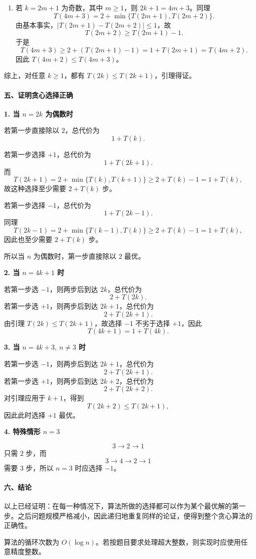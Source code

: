 \documentclass[12pt,a4paper]{article}
\begin{document}
\begin{answerbox}
\begin{enumerate}[leftmargin=2.5em]
    \item 若 $k=2m+1$ 为奇数，其中 $m\ge 1$，则 $2k+1=4m+3$。同理
    \[
    T(4m+3)=2+\min\{T(2m+1),T(2m+2)\}.
    \]
    由基本事实，$|T(2m+1)-T(2m+2)|\le 1$，故
    \[
    T(2m+2)\ge T(2m+1)-1.
    \]
    于是
    \[
    T(4m+3)\ge 2+(T(2m+1)-1)=1+T(2m+1)=T(4m+2).
    \]
    因此 $T(4m+2)\le T(4m+3)$。
\end{enumerate}

综上，对任意 $k\ge 1$，都有 $T(2k)\le T(2k+1)$，引理得证。

\paragraph{五、证明贪心选择正确}
\textbf{1. 当 $n=2k$ 为偶数时}

若第一步直接除以 $2$，总代价为
\[
1+T(k).
\]

若第一步选择 $+1$，总代价为
\[
1+T(2k+1).
\]
而
\[
T(2k+1)=2+\min\{T(k),T(k+1)\}\ge 2+T(k)-1=1+T(k),
\]
故这种选择至少需要 $2+T(k)$ 步。

若第一步选择 $-1$，总代价为
\[
1+T(2k-1).
\]
同理
\[
T(2k-1)=2+\min\{T(k-1),T(k)\}\ge 2+T(k)-1=1+T(k),
\]
因此也至少需要 $2+T(k)$ 步。

所以当 $n$ 为偶数时，第一步直接除以 $2$ 最优。

\textbf{2. 当 $n=4k+1$ 时}

若第一步选 $-1$，则两步后到达 $2k$，总代价为
\[
2+T(2k).
\]
若第一步选 $+1$，则两步后到达 $2k+1$，总代价为
\[
2+T(2k+1).
\]
由引理 $T(2k)\le T(2k+1)$，故选择 $-1$ 不劣于选择 $+1$，因此
\[
T(4k+1)=1+T(4k).
\]

\textbf{3. 当 $n=4k+3,\ n\neq 3$ 时}

若第一步选 $-1$，则两步后到达 $2k+1$，总代价为
\[
2+T(2k+1).
\]
若第一步选 $+1$，则两步后到达 $2k+2$，总代价为
\[
2+T(2k+2).
\]
对引理应用于 $k+1$，得到
\[
T(2k+2)\le T(2k+1),
\]
因此此时选择 $+1$ 最优。

\textbf{4. 特殊情形 $n=3$}

\[
3\to 2\to 1
\]
只需 $2$ 步，而
\[
3\to 4\to 2\to 1
\]
需要 $3$ 步，所以 $n=3$ 时应选择 $-1$。

\paragraph{六、结论}
以上已经证明：在每一种情况下，算法所做的选择都可以作为某个最优解的第一步。之后问题规模严格减小，因此递归地重复同样的论证，便得到整个贪心算法的正确性。

算法的循环次数为 $O(\log n)$。若按题目要求处理超大整数，则实现时应使用任意精度整数。
\end{answerbox}
\end{document}
